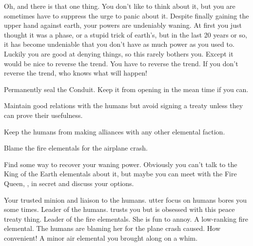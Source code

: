 \documentclass[char]{elementals}
\begin{document}
Oh, and there is that one thing. You don't like to think about it, but you are sometimes have to suppress the urge to panic about it. Despite finally gaining the upper hand against earth, your powers are undeniably waning. At first you just thought it was a phase, or a stupid trick of earth's, but in the last 20 years or so, it has become undeniable that you don't have as much power as you used to. Luckily you are good at denying things, so this rarely bothers you. Except it would be nice to reverse the trend. You have to reverse the trend. If you don't reverse the trend, who knows what will happen!   

\begin{itemz}[Goals]
	\item  Permanently seal the Conduit. Keep it from opening in the mean time if you can.
	\item  Maintain good relations with the humans but avoid signing a treaty unless they can prove their usefulness.
	\item  Keep the humans from making alliances with any other elemental faction.
	\item  Blame the fire elementals for the airplane crash.
	\item  Find some way to recover your waning power.  Obviously you can't talk to the King of the Earth elementals about it, but maybe you can meet with the Fire Queen, \cQueen{\full}, in secret and discuss your options.
\end{itemz}

\begin{contacts}
	\contact{\cNaturalist{\intro}} Your trusted minion and liaison to the humans. \cNaturalist{\Their} utter focus on humans bores you some times.
	\contact{\cLeader{\intro}} Leader of the humans. \cLeader{\They} trusts you but is obsessed with this peace treaty thing.
	\contact{\cQueen{\intro}} Leader of the fire elementals. She is fun to annoy.
  	\contact{\cJuliet{\intro}} A low-ranking fire elemental. The humans are blaming her for the plane crash \cNaturalist{} caused.  How convenient!
  	\contact{\cMiniAir{\intro}} A minor air elemental you brought along on a whim.
\end{contacts} 
\end{document}

